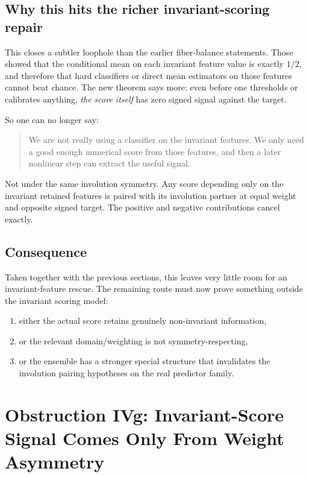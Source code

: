 \documentclass[11pt]{article}
\theoremstyle{remark}
\begin{document}
\subsection{Why this hits the richer invariant-scoring repair}

This closes a subtler loophole than the earlier fiber-balance statements.  Those showed that the
conditional mean on each invariant feature value is exactly \(1/2\), and therefore that hard
classifiers or direct mean estimators on those features cannot beat chance.  The new theorem says
more: even before one thresholds or calibrates anything, \emph{the score itself} has zero signed
signal against the target.

So one can no longer say:
\begin{quote}
We are not really using a classifier on the invariant features.  We only need a good enough
numerical score from those features, and then a later nonlinear step can extract the useful
signal.
\end{quote}

Not under the same involution symmetry.  Any score depending only on the invariant retained
features is paired with its involution partner at equal weight and opposite signed target.  The
positive and negative contributions cancel exactly.

\subsection{Consequence}

Taken together with the previous sections, this leaves very little room for an invariant-feature
rescue.  The remaining route must now prove something outside the invariant scoring model:
\begin{enumerate}[leftmargin=1.5em]
  \item either the actual score retains genuinely non-invariant information,
  \item or the relevant domain/weighting is not symmetry-respecting,
  \item or the ensemble has a stronger special structure that invalidates the involution pairing
  hypotheses on the real predictor family.
\end{enumerate}

\section{Obstruction IVg: Invariant-Score Signal Comes Only From Weight Asymmetry}
\end{document}
